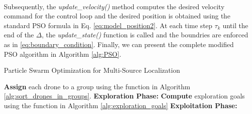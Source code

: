 \noindent\\
Subsequently, the \textit{update\_velocity()} method computes the desired 
velocity command for the control loop and the desired position is obtained 
using the standard PSO formula in Eq. \ref{eq:model_position2}.
At each time step $\tau_k$ until the end of the $\Delta$, 
the \textit{update\_state()} function is called and the
boundries are enforced as in \ref{eq:boundary_condition}.
Finally, we can present the complete modified PSO algorithm in 
Algorithm \ref{alg:PSO}.
\SetAlgoBlockMarkers{}{}
\begin{algorithm}
    \DontPrintSemicolon
    \caption{Particle Swarm Optimization for Multi-Source Localization}\label{alg:PSO}
    \;
    \;
    \textbf{Assign} each drone to a group using the function in Algorithm \ref{alg:sort_drones_in_groups}.\;
    \vspace{0.3\baselineskip}
    \DontPrintSemicolon \nonl \textbf{Exploration Phase:}\; \PrintSemicolon
    \textbf{Compute} exploration goals using the function in Algorithm \ref{alg:exploration_goals}\;
    \vspace{0.3\baselineskip}
    \DontPrintSemicolon \nonl \textbf{Exploitation Phase:}\; \PrintSemicolon
\end{algorithm}
